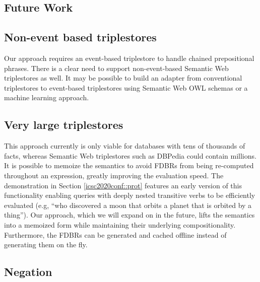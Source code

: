 \documentclass[../main.tex]{subfiles}
\begin{document}
\begin{refsection}


\section{Future Work}

\subsection{Non-event based triplestores}

Our approach requires an event-based triplestore to handle chained prepositional phrases. There is a clear need to support non-event-based Semantic Web triplestores as well. It may be possible to build an adapter from conventional triplestores to event-based triplestores using Semantic Web OWL schemas or a machine learning approach.

\subsection{Very large triplestores}

This approach currently is only viable for databases with tens of thousands of facts, whereas Semantic Web triplestores such as DBPedia \cite{dbpedia} could contain millions.  It is possible to memoize the semantics to avoid FDBRs from being re-computed throughout an expression, greatly improving the evaluation speed.  The demonstration in Section \ref{icsc2020conf::prot} features an early version of this functionality enabling queries with deeply nested transitive verbs to be efficiently evaluated (e.g, ``who discovered a moon that orbits a planet that is orbited by a thing'').  Our approach, which we will expand on in the future, lifts the semantics into a memoized form while maintaining their underlying compositionality.  Furthermore, the FDBRs can be generated and cached offline instead of generating them on the fly.

\subsection{Negation}


\end{refsection}
\end{document}
